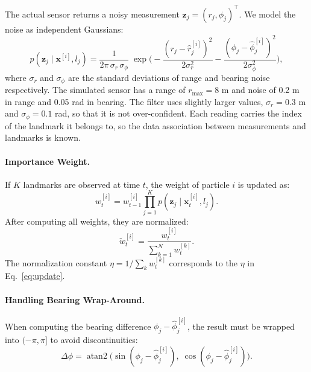 \documentclass[12pt, a4paper]{article}
\begin{document}
The actual sensor returns a noisy measurement \(\mathbf{z}_j = (r_j, \phi_j)^\top\).  We model the noise as independent Gaussians:
\begin{equation}
  p(\mathbf{z}_j \mid \mathbf{x}^{[i]}, l_j)
    = \frac{1}{2\pi\,\sigma_r\,\sigma_\phi}\;
      \exp\!\Biggl(
        -\frac{(r_j - \hat{r}_j^{[i]})^2}{2\sigma_r^2}
        -\frac{(\phi_j - \hat{\phi}_j^{[i]})^2}{2\sigma_\phi^2}
      \Biggr),
  \label{eq:meas_likelihood}
\end{equation}
where \(\sigma_r\) and \(\sigma_\phi\) are the standard deviations of range and bearing noise respectively.  The simulated sensor has a range of \(r_{\max} = 8\) m and noise of 0.2 m in range and 0.05 rad in bearing.  The filter uses slightly larger values, \(\sigma_r = 0.3\) m and \(\sigma_\phi = 0.1\) rad, so that it is not over-confident.  Each reading carries the index of the landmark it belongs to, so the data association between measurements and landmarks is known.

\paragraph{Importance Weight.}
If \(K\) landmarks are observed at time \(t\), the weight of particle \(i\) is updated as:
\begin{equation}
  w_t^{[i]} = w_{t-1}^{[i]} \prod_{j=1}^{K} p(\mathbf{z}_j \mid \mathbf{x}_t^{[i]}, l_j).
  \label{eq:weight}
\end{equation}
After computing all weights, they are normalized:
\begin{equation}
  \tilde{w}_t^{[i]} = \frac{w_t^{[i]}}{\sum_{k=1}^{N} w_t^{[k]}}.
  \label{eq:normalize}
\end{equation}
The normalization constant \(\eta = 1 / \sum_k w_t^{[k]}\) corresponds to the \(\eta\) in Eq.~\eqref{eq:update}.

\paragraph{Handling Bearing Wrap-Around.}
When computing the bearing difference \(\phi_j - \hat{\phi}_j^{[i]}\), the result must be wrapped into \((-\pi, \pi]\) to avoid discontinuities:
\begin{equation}
  \Delta\phi = \operatorname{atan2}\!\bigl(\sin(\phi_j - \hat{\phi}_j^{[i]}),\; \cos(\phi_j - \hat{\phi}_j^{[i]})\bigr).
  \label{eq:wrap}
\end{equation}
\end{document}
